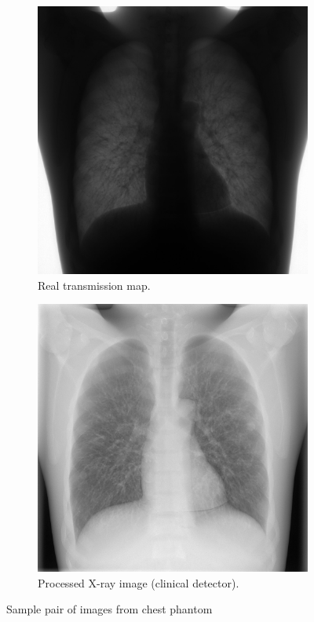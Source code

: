 \documentclass[nomenclature, english, bibtex]{kththesis}
\numberwithin{listing}{chapter}
\begin{document}
\begin{figure}[H]
    \centering
    \begin{subfigure}[t]{0.45\textwidth}
        \includegraphics[width=\textwidth]{figures/comm_unprocessed_sample.jpg}
        \caption{Real transmission map.}
    \end{subfigure}
    \begin{subfigure}[t]{0.45\textwidth}
        \includegraphics[width=\textwidth]{figures/comm_processed_sample.jpg}
        \caption{Processed X-ray image (clinical detector).}
    \end{subfigure}
    \caption{Sample pair of images from chest phantom}
    \label{fig:chestPhantomImages}
\end{figure}
\end{document}
